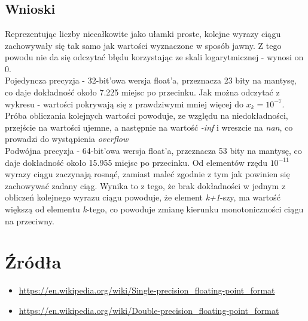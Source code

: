 \documentclass{article}
\begin{document}
\\\\\\\\\\\\\\\\\\\\\\\\\\\\\\
\subsection*{Wnioski}
\quad Reprezentując liczby niecałkowite jako ułamki 
proste, kolejne wyrazy ciągu zachowywały się
tak samo jak wartości wyznaczone w sposób jawny.
Z tego powodu nie da się odczytać błędu korzystając ze
skali logarytmicznej - wynosi on 0. \\
\null\quad Pojedyncza precyzja - 32-bit'owa wersja float'a, przeznacza
23 bity na mantysę, co daje dokładność około 7.225 miejsc po przecinku. 
Jak można odczytać z wykresu - wartości pokrywają się z prawdziwymi mniej więcej do $x_k=10^{-7}$.
Próba obliczania kolejnych wartości powoduje, ze względu na niedokładności,
przejście na wartości ujemne, a następnie na wartość \textit{-inf} i wreszcie na
\textit{nan}, co prowadzi do wystąpienia \textit{overflow}\\
\null\quad Podwójna precyzja - 64-bit'owa wersja float'a, przeznacza
53 bity na mantysę, co daje dokładność około 15.955 miejsc po przecinku. 
Od elementów rzędu $10^{-11}$ wyrazy ciągu zaczynają rosnąć, zamiast maleć zgodnie z
tym jak powinien się zachowywać zadany ciąg. Wynika to z tego, że brak dokładności
w jednym z obliczeń kolejnego wyrazu ciągu powoduje, że element \textit{k+1}-szy,
ma wartość większą od elementu \textit{k}-tego, co powoduje zmianę kierunku
monotoniczności ciągu na przeciwny.




\section*{Źródła}
\begin{itemize}
    \item \url{https://en.wikipedia.org/wiki/Single-precision_floating-point_format}
    \item \url{https://en.wikipedia.org/wiki/Double-precision_floating-point_format}
\end{itemize}
\end{document}
